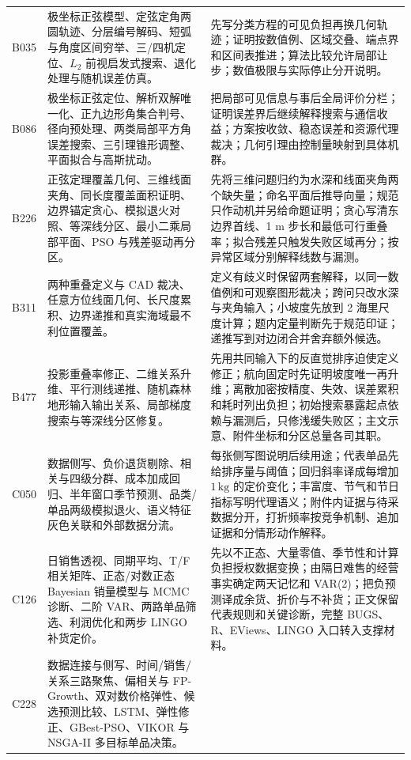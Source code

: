 \begin{longtable}{p{1.4cm}p{5.2cm}p{7.0cm}}
B035 & 极坐标正弦模型、定弦定角两圆轨迹、分层编号解码、短弧与角度区间穷举、三/四机定位、$L_2$ 前视启发式搜索、退化处理与随机误差仿真。 &
先写分类方程的可见负担再换几何轨迹；证明按数值例、区域交叠、端点界和区间表推进；算法比较允许局部让步；数值极限与实际停止分开说明。\\
B086 & 极坐标正弦定位、解析双解唯一化、正九边形角集合判号、径向预处理、两类局部平方角误差搜索、三引理锥形调整、平面拟合与高斯扰动。 &
把局部可见信息与事后全局评价分栏；证明误差界后继续解释搜索与通信收益；方案按收敛、稳态误差和资源代理裁决；几何引理由控制量映射到具体机群。\\
B226 & 正弦定理覆盖几何、三维线面夹角、同长度覆盖面积证明、边界锚定贪心、模拟退火对照、等深线分区、最小二乘局部平面、PSO 与残差驱动再分区。 &
先将三维问题归约为水深和线面夹角两个缺失量；命名平面后推导向量；规范只作动机并另给命题证明；贪心写清东边界首线、1 m 步长和最低可行重叠率；拟合残差只触发失败区域再分；按异常区域分别解释线数与漏测。\\
B311 & 两种重叠定义与 CAD 裁决、任意方位线面几何、长尺度累积、边界递推和真实海域最不利位置覆盖。 &
定义有歧义时保留两套解释，以同一数值例和可观察图形裁决；跨问只改水深与夹角输入；小坡度先放到 2 海里尺度计算；题内定量判断先于规范印证；递推写到对边闭合并舍弃额外候选。\\
B477 & 投影重叠率修正、二维关系升维、平行测线递推、随机森林地形输入输出关系、局部梯度搜索与等深线分区修复。 &
先用共同输入下的反直觉排序迫使定义修正；航向固定时先证明坡度唯一再升维；离散加密按精度、失效、误差累积和耗时列出负担；初始搜索暴露起点依赖与漏测后，只修浅缓失败区；主文示意、附件坐标和分区总量各司其职。\\
C050 & 数据侧写、负价退货剔除、相关与四级分群、成本加成回归、半年窗口季节预测、品类/单品两级模拟退火、语义特征灰色关联和外部数据分流。 &
每张侧写图说明后续用途；代表单品先给排序量与阈值；回归斜率译成每增加 $1\,\mathrm{kg}$ 的定价变化；丰富度、节气和节日指标写明代理语义；附件内证据与待采数据分开，打折频率按竞争机制、追加证据和分情形动作解释。\\
C126 & 日销售透视、同期平均、T/F 相关矩阵、正态/对数正态 Bayesian 销量模型与 MCMC 诊断、二阶 VAR、两路单品筛选、利润优化和两步 LINGO 补货定价。 &
先以不正态、大量零值、季节性和计算负担授权数据变换；由隔日难售的经营事实确定两天记忆和 VAR(2)；把负预测译成余货、折价与不补货；正文保留代表规则和关键诊断，完整 BUGS、R、EViews、LINGO 入口转入支撑材料。\\
C228 & 数据连接与侧写、时间/销售/关系三路聚焦、偏相关与 FP-Growth、双对数价格弹性、候选预测比较、LSTM、弹性修正、GBest-PSO、VIKOR 与 NSGA-II 多目标单品决策。 &

\end{longtable}
